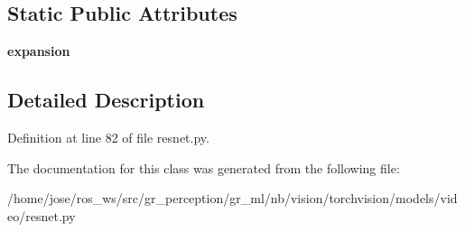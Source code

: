 \subsection*{Static Public Attributes}
\begin{DoxyCompactItemize}
\item 
\mbox{\label{classtorchvision_1_1models_1_1video_1_1resnet_1_1BasicBlock_a120a0a3f82cca85b248032bd02962267}} 
{\bfseries expansion}
\end{DoxyCompactItemize}


\subsection{Detailed Description}


Definition at line 82 of file resnet.\+py.



The documentation for this class was generated from the following file\+:\begin{DoxyCompactItemize}
\item 
/home/jose/ros\+\_\+ws/src/gr\+\_\+perception/gr\+\_\+ml/nb/vision/torchvision/models/video/resnet.\+py\end{DoxyCompactItemize}
